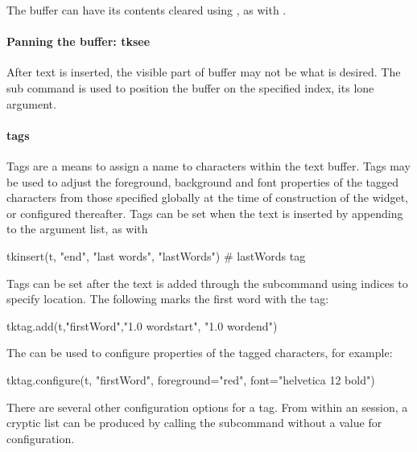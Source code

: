 The buffer can have its contents cleared using , as
with .

\paragraph{Panning the buffer: tksee}
After text is inserted, the visible part of buffer may not be what is
desired. The  sub command is used to position
the buffer on the specified index, its lone argument.


\paragraph{tags}
Tags are a means to assign a name to characters within the text
buffer. Tags may be used to adjust the foreground, background and font
properties of the tagged characters from those specified globally at
the time of construction of the widget, or configured thereafter. Tags
can be set when the text is inserted by appending to the argument
list, as with
\begin{Schunk}
\begin{Sinput}
 tkinsert(t, "end", "last words", "lastWords") # lastWords tag
\end{Sinput}
\end{Schunk}

Tags can be set after the text is added through the
 subcommand using indices to specify
location. The following marks the first word with the 
tag:
\begin{Schunk}
\begin{Sinput}
 tktag.add(t,"firstWord","1.0 wordstart", "1.0 wordend")
\end{Sinput}
\end{Schunk}
The  can be used to configure properties of the tagged characters, for example:
\begin{Schunk}
\begin{Sinput}
 tktag.configure(t, "firstWord", foreground="red", 
                 font="helvetica 12 bold")
\end{Sinput}
\end{Schunk}
%
There are several other configuration options for a tag. From within
an \R\/ session, a cryptic list can be produced by calling the
subcommand  without a value for
configuration.


